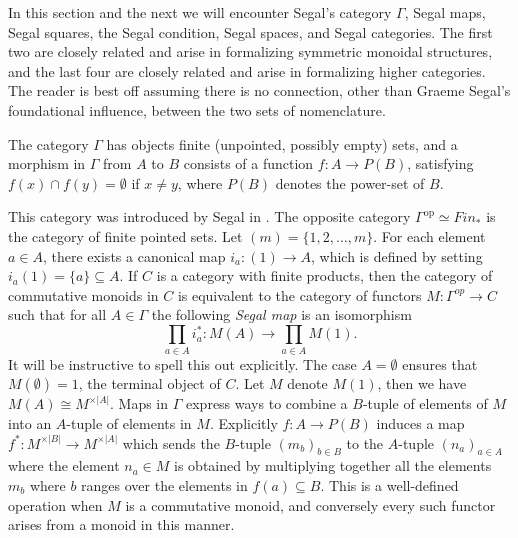 \documentclass{amsart}
\begin{document}
\begin{warning}
In this section and the next we will encounter Segal's category $\Gamma$, Segal maps, Segal squares, the Segal condition, Segal spaces, and Segal categories.  The first two are closely related and arise in formalizing symmetric monoidal structures, and the last four are closely related and arise in formalizing higher categories.  The reader is best off assuming there is no connection, other than Graeme Segal's foundational influence, between the two sets of nomenclature.
\end{warning}

\begin{definition}
	The category  $\Gamma$ has objects finite (unpointed, possibly empty) sets, and a morphism in $\Gamma$ from $A$ to $B$ consists of a function $f: A \to P(B)$, satisfying $f(x) \cap f(y) = \emptyset$ if $x \neq y$, where $P(B)$ denotes the power-set of $B$. 
\end{definition}

This category was introduced by Segal in \cite{MR0353298}.  The opposite category $\Gamma^\textrm{op} \simeq Fin_*$ is the category of finite pointed sets. Let $(m) = \{ 1, 2, \dots, m\}$. For each element $a \in A$, there exists a canonical map $i_a: (1) \to A$, which is defined by setting $i_a(1) = \{a\} \subseteq A$. If $C$ is a category with finite products, then the category of commutative monoids in $C$ is equivalent to the category of functors $M:\Gamma^{op} \to C$ such that for all $A\in \Gamma$ the following {\em Segal map} is an isomorphism
\begin{equation*}
	\prod_{a \in A} i_a^*: M(A) \to \prod_{a \in A} M(1).
\end{equation*}
It will be instructive to spell this out explicitly. The case $A=\emptyset$ ensures that $M(\emptyset) = 1$, the terminal object of $C$.  Let $M$ denote $M(1)$, then we have $M(A) \cong M^{\times |A|}$. Maps in $\Gamma$ express ways to combine a $B$-tuple of elements of $M$ into an $A$-tuple of elements in $M$. Explicitly $f: A \to P(B)$
induces a map $f^*: M^{\times |B|} \to M^{\times |A|}$ which sends the $B$-tuple $(m_b)_{b \in B}$ to the $A$-tuple $(n_a)_{a \in A}$ where the element $n_a \in M$ is obtained by multiplying together all the elements $m_b$ where $b$ ranges over the elements in $f(a) \subseteq B$. This is a well-defined operation when $M$ is a commutative monoid, and conversely every such functor arises from a monoid in this manner. 
\end{document}
